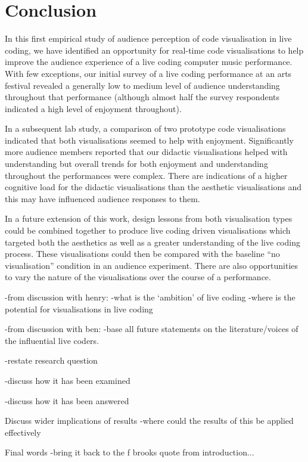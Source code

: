 
\chapter{Conclusion}
\label{chap:conclusion}


In this first empirical study of audience perception of code visualisation in live coding, we have identified an opportunity for real-time code visualisations to help improve the audience experience of a live coding computer music performance. With few exceptions, our initial survey of a live coding performance at an arts festival revealed a generally low to medium level of audience understanding throughout that performance (although almost half the survey respondents indicated a high level of enjoyment throughout).

In a subsequent lab study, a comparison of two prototype code visualisations indicated that both visualisations seemed to help with enjoyment. Significantly more audience members reported that our didactic visualisations helped with understanding but overall trends for both enjoyment and understanding throughout the performances were complex. There are indications of a higher cognitive load for the didactic visualisations than the aesthetic visualisations and this may have influenced audience responses to them.

In a future extension of this work, design lessons from both visualisation types could be combined together to produce live coding driven visualisations which targeted both the aesthetics as well as a greater understanding of the live coding process. These visualisations could then be compared with the baseline ``no visualisation'' condition in an audience experiment. There are also opportunities to vary the nature of the visualisations over the course of a performance.

-from discussion with henry:
	-what is the `ambition' of live coding
	-where is the potential for visualisations in live coding

-from discussion with ben:
	-base all future statements on the literature/voices of the influential live coders.

-restate research question

-discuss how it has been examined

-discuss how it has been answered

Discuss wider implications of results
-where could the results of this be applied effectively 

Final words
-bring it back to the f brooks quote from introduction... 

